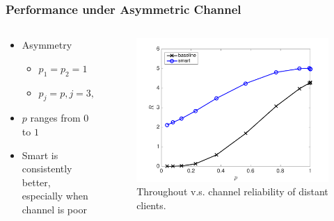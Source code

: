 \documentclass{beamer}
\begin{document}
\begin{frame}
\frametitle{Performance under Asymmetric Channel}
\begin{columns}
  \begin{column}{.5\textwidth}
\begin{itemize}
  \item Asymmetry
    \begin{itemize}
      \item $p_1=p_2=1$
      \item $p_j=p, j=3,4,\dotsc,N$
    \end{itemize}
  \item $p$ ranges from $0$ to $1$
  \item Smart is consistently better, especially when channel is poor
\end{itemize}
  \end{column}
  \begin{column}{.5\textwidth}
\begin{figure}[htbp]
  \centering
  \includegraphics[height=.5\textheight]{R_p_asym.pdf}
  \caption{Throughout v.s. channel reliability of distant clients.}
\end{figure}
  \end{column}
\end{columns}
\end{frame}
\end{document}
